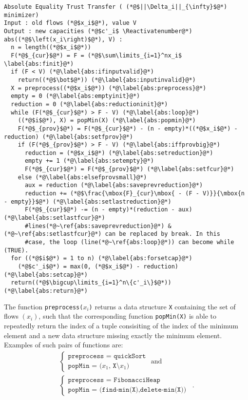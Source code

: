 \Suppressnumber
\begin{lstlisting}[label=abs, style=numbers]
Absolute Equality Trust Transfer ( (*@$||\Delta_i||_{\infty}$@*) minimizer)
Input : old flows (*@$x_i$@*), value V
Output : new capacities (*@$c'_i$ \Reactivatenumber@*)
abs((*@$\left(x_i\right)$@*), V) :
  n = length((*@$x_i$@*))
  F(*@$_{cur}$@*) = F = (*@$\sum\limits_{i=1}^nx_i$ \label{abs:finit}@*)
  if (F < V) (*@\label{abs:ifinputvalid}@*)
    return((*@$\bot$@*)) (*@\label{abs:inputinvalid}@*)
  X = preprocess((*@$x_i$@*)) (*@\label{abs:preprocess}@*)
  empty = 0 (*@\label{abs:emptyinit}@*)
  reduction = 0 (*@\label{abs:reductioninit}@*)
  while (F(*@$_{cur}$@*) > F - V) (*@\label{abs:loop}@*)
    ((*@$i$@*), X) = popMin(X) (*@\label{abs:popmin}@*)
    F(*@$_{prov}$@*) = F(*@$_{cur}$@*) - (n - empty)*((*@$x_i$@*) - reduction) (*@\label{abs:setfprov}@*)
    if (F(*@$_{prov}$@*) > F - V) (*@\label{abs:iffprovbig}@*)
      reduction = (*@$x_i$@*) (*@\label{abs:setreduction}@*)
      empty += 1 (*@\label{abs:setempty}@*)
      F(*@$_{cur}$@*) = F(*@$_{prov}$@*) (*@\label{abs:setfcur}@*)
    else (*@\label{abs:elsefprovsmall}@*)
      aux = reduction (*@\label{abs:saveprevreduction}@*)
      reduction += (*@$\frac{\mbox{F}_{cur}\mbox{ - (F - V)}}{\mbox{n - empty}}$@*) (*@\label{abs:setlastreduction}@*)
      F(*@$_{cur}$@*) -= (n - empty)*(reduction - aux) (*@\label{abs:setlastfcur}@*)
      #lines(*@~\ref{abs:saveprevreduction}@*) &(*@~\ref{abs:setlastfcur}@*) can be replaced by break. In this
      #case, the loop (line(*@~\ref{abs:loop}@*)) can become while (TRUE).
  for ((*@$i$@*) = 1 to n) (*@\label{abs:forsetcap}@*)
    (*@$c'_i$@*) = max(0, (*@$x_i$@*) - reduction) (*@\label{abs:setcap}@*)
  return((*@$\bigcup\limits_{i=1}^n\{c'_i\}$@*)) (*@\label{abs:return}@*)
\end{lstlisting}

The function \texttt{preprocess(}$x_i$\texttt{)} returns a data structure \texttt{X} containing the set of flows
$\left(x_i\right)$, such that the corresponding function \texttt{popMin(X)} is able to repeatedly return the index of a tuple
consisiting of the index of the minimum element and a new data structure missing exactly the minimum element. Examples of
such pairs of functions are:
\begin{equation*}
\begin{gathered}
  \begin{cases}
    \texttt{preprocess = quickSort} \\
    \texttt{popMin = (}x_1\texttt{, X}\setminus x_1\texttt{)}
  \end{cases}
  \mbox{ and} \\
  \begin{cases}
    \texttt{preprocess = FibonacciHeap} \\
    \texttt{popMin = (find-min(X),delete-min(X))}
  \end{cases} \enspace.
\end{gathered}
\end{equation*}
